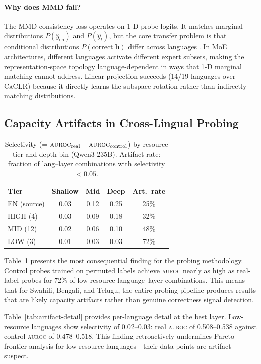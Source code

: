 \documentclass[11pt,a4paper]{article}
\newcommand{\auroc}{\textsc{auroc}}
\newcommand{\caclr}{\textsc{CaCLR}}
\begin{document}
\paragraph{Why does MMD fail?}
The MMD consistency loss operates on 1-D probe logits.
It matches marginal distributions $P(\hat{y}_{\text{en}})$ and $P(\hat{y}_t)$, but the core transfer problem is that conditional distributions $P(\text{correct} | \mathbf{h})$ differ across languages \cite{zhao2019learning}.
In MoE architectures, different languages activate different expert subsets, making the representation-space topology language-dependent in ways that 1-D marginal matching cannot address.
Linear projection succeeds (14/19 languages over \caclr{}) because it directly learns the subspace rotation rather than indirectly matching distributions.

\subsection{Capacity Artifacts in Cross-Lingual Probing}
\label{sec:control-results}

\begin{table}[t]
\centering
\small
\begin{tabular}{lcccc}
\toprule
\textbf{Tier} & \textbf{Shallow} & \textbf{Mid} & \textbf{Deep} & \textbf{Art.\ rate} \\
\midrule
EN (source) & 0.03 & 0.12 & 0.25 & 25\% \\
HIGH (4) & 0.03 & 0.09 & 0.18 & 32\% \\
MID (12) & 0.02 & 0.06 & 0.10 & 48\% \\
LOW (3) & 0.01 & 0.03 & 0.03 & 72\% \\
\bottomrule
\end{tabular}
\caption{Selectivity (= $\auroc{}_\text{real} - \auroc{}_\text{control}$) by resource tier and depth bin (Qwen3-235B). Artifact rate: fraction of lang--layer combinations with selectivity${<}0.05$.}
\label{tab:selectivity}
\end{table}

Table~\ref{tab:selectivity} presents the most consequential finding for the probing methodology.
Control probes trained on permuted labels achieve \auroc{} nearly as high as real-label probes for 72\% of low-resource language--layer combinations.
This means that for Swahili, Bengali, and Telugu, the entire probing pipeline produces results that are likely capacity artifacts rather than genuine correctness signal detection.

Table~\ref{tab:artifact-detail} provides per-language detail at the best layer.
Low-resource languages show selectivity of 0.02--0.03: real \auroc{} of 0.508--0.538 against control \auroc{} of 0.478--0.518.
This finding retroactively undermines Pareto frontier analysis for low-resource languages---their data points are artifact-suspect.
\end{document}
